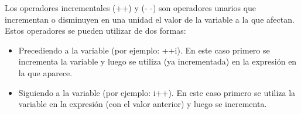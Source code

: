 Los operadores incrementales (++) y (- -) son operadores unarios que incrementan o
disminuyen en una unidad el valor de la variable a la que afectan. Estos operadores se
pueden utilizar de dos formas:

\begin{itemize}
	\item Precediendo a la variable (por ejemplo: ++i). En este caso primero se incrementa la
	variable y luego se utiliza (ya incrementada) en la expresión en la que aparece.
	\item Siguiendo a la variable (por ejemplo: i++). En este caso primero se utiliza la variable en la
	expresión (con el valor anterior) y luego se incrementa.
\end{itemize}